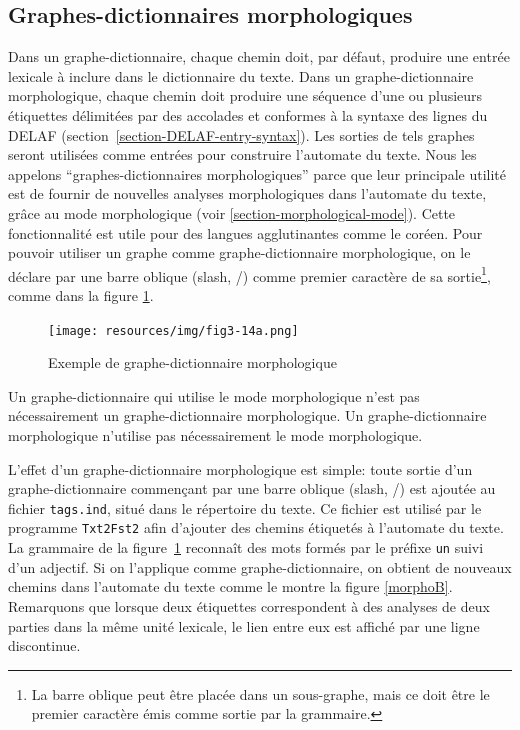 \subsection{Graphes-dictionnaires morphologiques}
\label{section-morphological-dictionary-graphs}
Dans un graphe-dic\-tion\-naire, chaque chemin doit, par défaut, produire une entrée lexicale à inclure dans le dictionnaire du
texte. Dans un graphe-dic\-tion\-naire morphologique, chaque chemin doit produire une séquence d'une ou plusieurs
étiquettes délimitées par des accolades et conformes à la syntaxe des lignes du DELAF
 (section~\ref{section-DELAF-entry-syntax}).
Les sorties de tels graphes seront utilisées comme entrées pour construire l'automate du texte. Nous
les appelons ``graphes-dictionnaires morphologiques'' parce que leur principale utilité est de
fournir de nouvelles analyses morphologiques dans l'automate du texte, grâce au mode morphologique
(voir \ref{section-morphological-mode}). Cette fonctionnalité est utile pour des langues
agglutinantes comme le coréen.
Pour pouvoir utiliser un graphe comme graphe-dic\-tion\-naire morphologique, on le déclare
par une barre oblique (slash, /) comme premier caractère de sa sortie\footnote{La barre oblique
peut être placée dans un sous-graphe, mais ce doit être le premier caractère émis comme
sortie par la grammaire.}, comme dans la figure \ref{morphoA}.

\begin{figure}[!ht]
\begin{center}
\texttt{[image: resources/img/fig3-14a.png]}
\caption{Exemple de graphe-dictionnaire morphologique\label{morphoA}}
\end{center}
\end{figure}

\bigskip
\noindent Un graphe-dic\-tion\-naire qui utilise le mode morphologique n'est pas nécessairement un
graphe-dic\-tion\-naire morphologique. Un graphe-dic\-tion\-naire morphologique n'utilise pas
nécessairement le mode morphologique.

\bigskip
\noindent L'effet d'un graphe-dic\-tion\-naire morphologique est simple: toute sortie d'un
graphe-dic\-tion\-naire commençant par une barre oblique (slash, /) 
est ajoutée au fichier \verb+tags.ind+,  situé dans le répertoire du texte.
Ce fichier est utilisé par le programme \verb+Txt2Fst2+ afin d'ajouter des chemins étiquetés à
l'automate du texte. La grammaire de la figure~\ref{morphoA} reconnaît des mots
formés par le préfixe \verb+un+ suivi d'un adjectif. Si on l'applique comme graphe-dic\-tion\-naire,
on obtient de nouveaux chemins dans l'automate du texte comme le montre la figure
\ref{morphoB}. Remarquons que lorsque deux étiquettes correspondent à des analyses
de deux parties dans la même
unité lexicale, le lien entre eux est affiché par une ligne discontinue.


